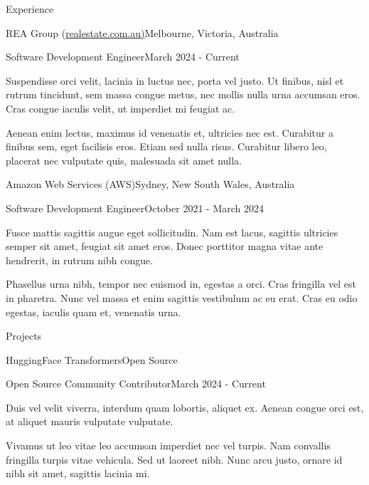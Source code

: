 \documentclass{xsha}
\begin{document}
\begin{xsection}{Experience}

\begin{xheading}{REA Group (\href{https://realestate.com.au/}{realestate.com.au)}}{Melbourne, Victoria, Australia}
\begin{xsubheading}{Software Development Engineer}{March 2024 - Current}
\item Suspendisse orci velit, lacinia in luctus nec, porta vel justo. Ut finibus, nisl et rutrum tincidunt, sem massa congue metus, nec mollis nulla urna accumsan eros. Cras congue iaculis velit, ut imperdiet mi feugiat ac.
\item Aenean enim lectus, maximus id venenatis et, ultricies nec est. Curabitur a finibus sem, eget facilisis eros. Etiam sed nulla risus. Curabitur libero leo, placerat nec vulputate quis, malesuada sit amet nulla.
\end{xsubheading}
\end{xheading}

\begin{xheading}{Amazon Web Services (AWS)}{Sydney, New South Wales, Australia}
\begin{xsubheading}{Software Development Engineer}{October 2021 - March 2024}
\item Fusce mattis sagittis augue eget sollicitudin. Nam est lacus, sagittis ultricies semper sit amet, feugiat sit amet eros. Donec porttitor magna vitae ante hendrerit, in rutrum nibh congue. 
\item Phasellus urna nibh, tempor nec euismod in, egestas a orci. Cras fringilla vel est in pharetra. Nunc vel massa et enim sagittis vestibulum ac eu erat. Cras eu odio egestas, iaculis quam et, venenatis urna.
\end{xsubheading}
\end{xheading}

\end{xsection}

\begin{xsection}{Projects}

\begin{xheading}{HuggingFace Transformers}{Open Source}
\begin{xsubheading}{Open Source Community Contributor}{March 2024 - Current}
\item Duis vel velit viverra, interdum quam lobortis, aliquet ex. Aenean congue orci est, at aliquet mauris vulputate vulputate. 
\item Vivamus ut leo vitae leo accumsan imperdiet nec vel turpis. Nam convallis fringilla turpis vitae vehicula. Sed ut laoreet nibh. Nunc arcu justo, ornare id nibh sit amet, sagittis lacinia mi.
\end{xsubheading}
\end{xheading}

\end{xsection}
\end{document}
